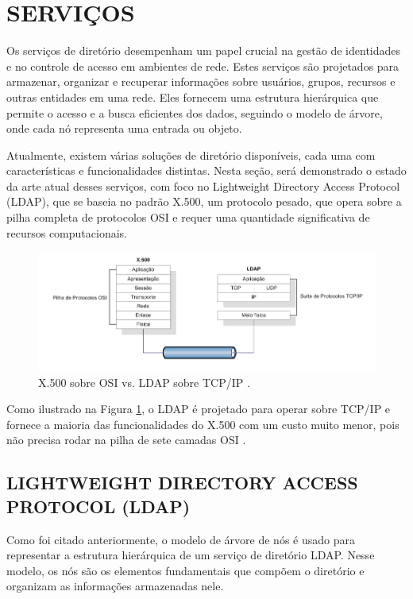 \section{SERVIÇOS}
Os serviços de diretório desempenham um papel crucial na gestão de identidades e no controle de acesso em ambientes de rede. Estes serviços são projetados para armazenar, organizar e recuperar informações sobre usuários, grupos, recursos e outras entidades em uma rede. Eles fornecem uma estrutura hierárquica que permite o acesso e a busca eficientes dos dados, seguindo o modelo de árvore, onde cada nó representa uma entrada ou objeto.

Atualmente, existem várias soluções de diretório disponíveis, cada uma com características e funcionalidades distintas. Nesta seção, será demonstrado o estado da arte atual desses serviços, com foco no Lightweight Directory Access Protocol (LDAP), que se baseia no padrão X.500, um protocolo pesado, que opera sobre a pilha completa de protocolos OSI e requer uma quantidade significativa de recursos computacionais.

\begin{figure}[h]
    \centering
	\includegraphics[scale=0.6]{textuais/CamadasX.500LDAP.png}
	\caption[X.500 sobre OSI vs. LDAP sobre TCP/IP-]{X.500 sobre OSI vs. LDAP sobre TCP/IP \cite{machado2020}.
	\label{fig:camadaX.500Ldap}}
\end{figure}

Como ilustrado na Figura \ref{fig:camadaX.500Ldap}, o LDAP é projetado para operar sobre TCP/IP e fornece a maioria das funcionalidades do X.500 com um custo muito menor, pois não precisa rodar na pilha de sete camadas OSI \cite{machado2020}.

\subsection{LIGHTWEIGHT DIRECTORY ACCESS PROTOCOL (LDAP)}

Como foi citado anteriormente, o modelo de árvore de nós é usado para representar a estrutura hierárquica de um serviço de diretório LDAP. Nesse modelo, os nós são os elementos fundamentais que compõem o diretório e organizam as informações armazenadas nele.

